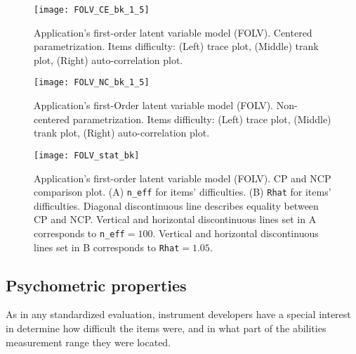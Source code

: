 %
\begin{figure}[H]
	\centering
	\texttt{[image: FOLV\_CE\_bk\_1\_5]}
	\caption[Application's first-order latent variable model (FOLV). Centered parametrization. Items difficulty. Trace, trank and auto-correlation plots.]%
	{Application's first-order latent variable model (FOLV). Centered parametrization. Items difficulty: (Left) trace plot, (Middle) trank plot, (Right) auto-correlation plot.}
	\label{fig:FOLV_CE_chains1}
\end{figure}
%
\begin{figure}[H]
	\centering
	\texttt{[image: FOLV\_NC\_bk\_1\_5]}
	\caption[Application's first-order latent variable model (FOLV). Non-centered parametrization. Items difficulty. Trace, trank and auto-correlation plots.]%
	{Application's first-Order latent variable model (FOLV). Non-centered parametrization. Items difficulty: (Left) trace plot, (Middle) trank plot, (Right) auto-correlation plot.}
	\label{fig:FOLV_NC_chains1}
\end{figure}
%
\begin{figure}[H]
	\centering
	\texttt{[image: FOLV\_stat\_bk]}
	\caption[Application's first-order latent variable model (FOLV). CP and NCP comparison plot.]%
	{Application's first-order latent variable model (FOLV). CP and NCP comparison plot. (A) \texttt{n\_eff} for items' difficulties. (B) \texttt{Rhat} for items' difficulties. Diagonal discontinuous line describes equality between CP and NCP. Vertical and horizontal discontinuous lines set in A corresponds to \texttt{n\_eff}$=100$. Vertical and horizontal discontinuous lines set in B corresponds to \texttt{Rhat}$=1.05$. }
	\label{fig:FOLV_stat1}
\end{figure}



\subsection{Psychometric properties}

As in any standardized evaluation, instrument developers have a special interest in determine how difficult the items were, and in what part of the abilities measurement range they were located.

